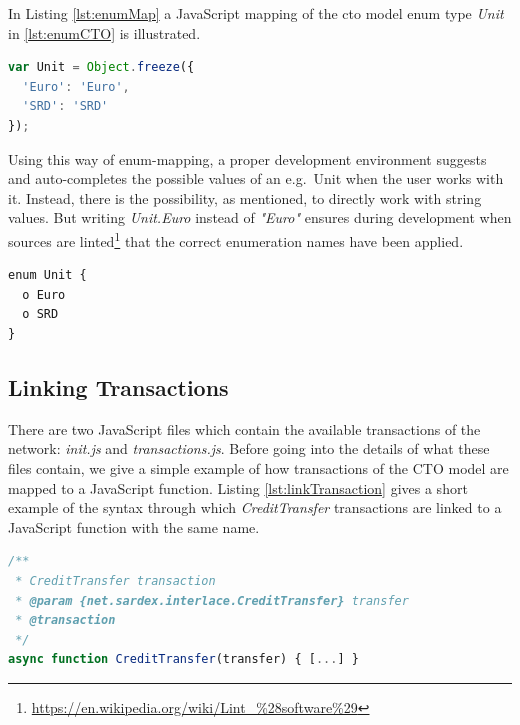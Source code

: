 In Listing \ref{lst:enumMap} a JavaScript mapping of the cto model enum type \textit{Unit} in \ref{lst:enumCTO} is illustrated.

\begin{center}
\begin{minipage}{0.8\textwidth}
\small
\begin{lstlisting}[language=javascript,firstnumber=1,caption={\bf\small JavaScript enumeration mapping}, captionpos=b,label=lst:enumMap]
var Unit = Object.freeze({
  'Euro': 'Euro',
  'SRD': 'SRD'
});
\end{lstlisting}
\end{minipage}
\end{center}

Using this way of enum-mapping, a proper development environment suggests and auto-completes the possible values of an e.g.\ Unit when the user works with it. Instead, there is the possibility, as mentioned, to directly work with string values. But writing \textit{Unit.Euro} instead of \textit{"Euro"} ensures during development when sources are linted\footnote{\url{https://en.wikipedia.org/wiki/Lint_\%28software\%29}} that the correct enumeration names have been applied.

\begin{center}
\begin{minipage}{0.8\textwidth}
\small
\begin{lstlisting}[language=cto,firstnumber=1,caption={\bf\small enum in CTO-model}, captionpos=b,label=lst:enumCTO]
enum Unit {
  o Euro
  o SRD
}
\end{lstlisting}
\end{minipage}
\end{center}

\subsection{Linking Transactions}
\label{sec:link transactions}

There are two JavaScript files which contain the available transactions of the network: \textit{init.js} and \textit{transactions.js}. Before going into the details of what these files contain, we give a simple example of how transactions of the CTO model are mapped to a JavaScript function. Listing \ref{lst:linkTransaction} gives a short example of the syntax through which \textit{CreditTransfer} transactions are linked to a JavaScript function with the same name.

\begin{center}
\begin{minipage}{0.8\textwidth}
\small
\begin{lstlisting}[language=javascript,firstnumber=1,caption={\bf\small Connection of JavaScript function CreditTransfer to CTO-model transaction type}, captionpos=b,label=lst:linkTransaction]
/**
 * CreditTransfer transaction
 * @param {net.sardex.interlace.CreditTransfer} transfer
 * @transaction
 */
async function CreditTransfer(transfer) { [...] }
\end{lstlisting}
\end{minipage}
\end{center}

